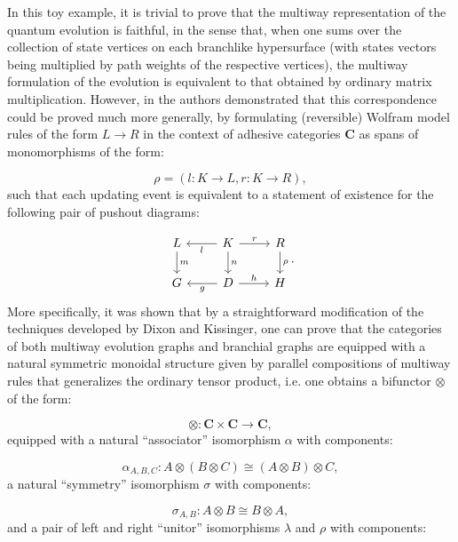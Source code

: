 \documentclass{article}
\begin{document}
In this toy example, it is trivial to prove that the multiway representation of the quantum evolution is faithful, in the sense that, when one sums over the collection of state vertices on each branchlike hypersurface (with states vectors being multiplied by path weights of the respective vertices), the multiway formulation of the evolution is equivalent to that obtained by ordinary matrix multiplication. However, in \cite{gorard4} the authors demonstrated that this correspondence could be proved much more generally, by formulating (reversible) Wolfram model rules of the form ${L \to R}$ in the context of adhesive categories ${\mathbf{C}}$ as spans of monomorphisms of the form:

\begin{equation}
\rho = \left( l : K \to L, r : K \to R \right),
\end{equation}
such that each updating event is equivalent to a statement of existence for the following pair of pushout diagrams\cite{ehrig}\cite{habel}:

\begin{equation}
\begin{tikzcd}
L \arrow[d, "m"] & K \arrow[l, "l"] \arrow[d, "n"] \arrow [r, "r"] & R \arrow[d, "\rho"]\\
G & D \arrow[l, "g"] \arrow[r, "h"] & H
\end{tikzcd}.
\end{equation}
More specifically, it was shown that by a straightforward modification of the techniques developed by Dixon and Kissinger\cite{dixon}, one can prove that the categories of both multiway evolution graphs and branchial graphs are equipped with a natural symmetric monoidal structure\cite{baez} given by parallel compositions of multiway rules that generalizes the ordinary tensor product, i.e. one obtains a bifunctor ${\otimes}$ of the form:

\begin{equation}
\otimes : \mathbf{C} \times \mathbf{C} \to \mathbf{C},
\end{equation}
equipped with a natural ``associator'' isomorphism ${\alpha}$ with components:

\begin{equation}
\alpha_{A, B, C} : A \otimes \left( B \otimes C \right) \cong \left( A \otimes B \right) \otimes C,
\end{equation}
a natural ``symmetry'' isomorphism ${\sigma}$ with components:

\begin{equation}
\sigma_{A, B} : A \otimes B \cong B \otimes A,
\end{equation}
and a pair of left and right ``unitor'' isomorphisms ${\lambda}$ and ${\rho}$ with components:
\end{document}
